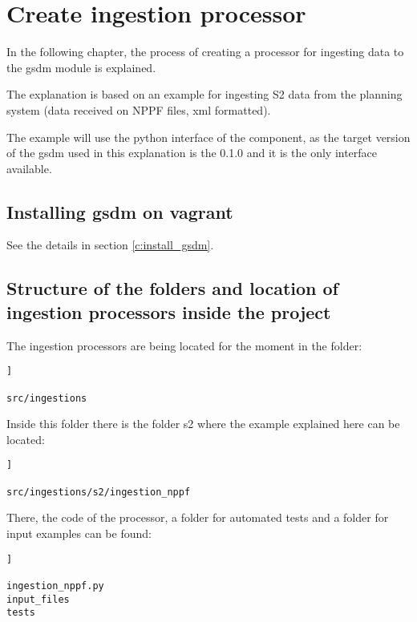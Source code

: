 \chapter{Create ingestion processor}\label{c:intro}

In the following chapter, the process of creating a processor for ingesting data to the gsdm module is explained.

The explanation is based on an example for ingesting S2 data from the planning system (data received on NPPF files, xml formatted).

The example will use the python interface of the component, as the target version of the gsdm used in this explanation is the 0.1.0 and it is the only interface available.

\section{Installing \acrshort{gsdm} on vagrant}

See the details in section \ref{c:install_gsdm}.

\section{Structure of the folders and location of ingestion processors inside the project}

The ingestion processors are being located for the moment in the folder:

\begin{lstlisting}[breaklines=true, style=c]]

src/ingestions

\end{lstlisting}

Inside this folder there is the folder s2 where the example explained here can be located:

\begin{lstlisting}[breaklines=true, style=c]]

src/ingestions/s2/ingestion_nppf

\end{lstlisting}

There, the code of the processor, a folder for automated tests and a folder for input examples can be found:

\begin{lstlisting}[breaklines=true, style=c]]

ingestion_nppf.py
input_files
tests

\end{lstlisting}


